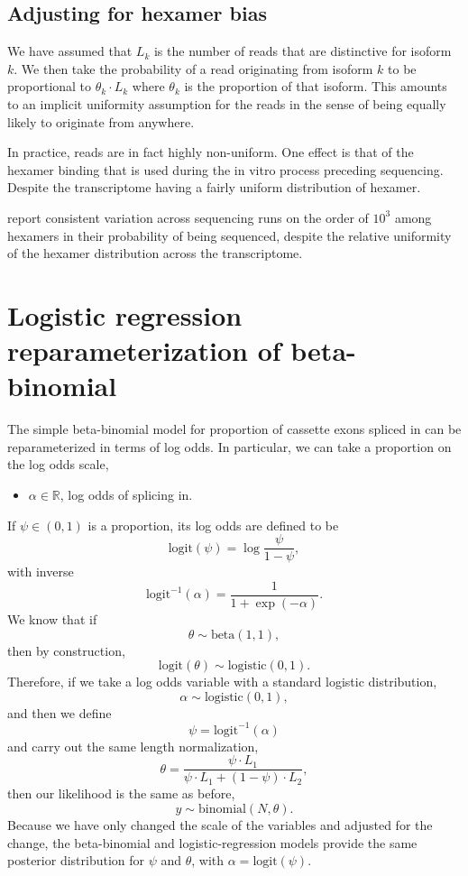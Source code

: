 \documentclass[11pt]{report}
\newcommand{\logit}{\textrm{logit}}
\newcommand{\ilogit}{\logit^{-1}}
\begin{document}
\subsection{Adjusting for hexamer bias}

We have assumed that $L_k$ is the number of reads that are distinctive
for isoform $k$. We then take the probability of a read originating
from isoform $k$ to be proportional to $\theta_k \cdot L_k$ where
$\theta_k$ is the proportion of that isoform. This amounts to an
implicit uniformity assumption for the reads in the sense of being
equally likely to originate from anywhere.

In practice, reads are in fact highly non-uniform. One effect is that
of the hexamer binding that is used during the in vitro process
preceding sequencing. Despite the transcriptome having a fairly
uniform distribution of hexamer.

\cite{hansen2010biases} report consistent variation across sequencing
runs on the order of $10^3$ among hexamers in their probability of
being sequenced, despite the relative uniformity of the hexamer
distribution across the transcriptome.


\section{Logistic regression reparameterization of beta-binomial}

The simple beta-binomial model for proportion of cassette exons
spliced in can be reparameterized in terms of log odds. In particular,
we can take a proportion on the log odds scale,
%
\begin{itemize}
\item $\alpha \in \mathbb{R}$, log odds of splicing in.
\end{itemize}
%
If $\psi \in (0, 1)$ is a proportion, its log odds are defined to be
\[
  \logit(\psi) = \log \frac{\psi}{1 - \psi},
\]
with inverse
\[
  \ilogit(\alpha) = \frac{1}{1 + \exp(-\alpha)}.
\]
We know that if
\[
  \theta \sim \textrm{beta}(1, 1),
\]
then by construction,
\[
  \logit(\theta) \sim \textrm{logistic}(0, 1).
\]
Therefore, if we take a log odds variable with a standard logistic
distribution,
\[
  \alpha \sim \textrm{logistic}(0, 1),
\]
and then we define
\[
  \psi = \ilogit(\alpha)
\]
and carry out the same length normalization,
\[
  \theta = \frac{\psi \cdot L_1}{\psi \cdot L_1 + (1 - \psi) \cdot L_2},
\]
then our likelihood is the same as before,
\[
  y \sim \textrm{binomial}(N, \theta).
\]
Because we have only changed the scale of the variables and adjusted
for the change, the beta-binomial and logistic-regression models
provide the same posterior distribution for $\psi$ and $\theta$, with
$\alpha = \logit(\psi)$.
\end{document}

